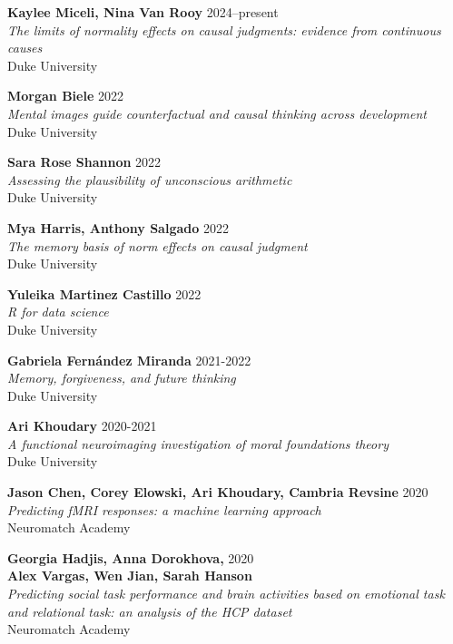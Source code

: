 \textbf{Kaylee Miceli, Nina Van Rooy} \hfill 2024--present \\
\emph{The limits of normality effects on causal judgments: evidence from continuous causes} \\
Duke University

\textbf{Morgan Biele} \hfill 2022 \\
\emph{Mental images guide counterfactual and causal thinking across development} \\
Duke University

\textbf{Sara Rose Shannon} \hfill 2022 \\
\emph{Assessing the plausibility of unconscious arithmetic} \\
Duke University

\textbf{Mya Harris, Anthony Salgado} \hfill 2022 \\
\emph{The memory basis of norm effects on causal judgment} \\
Duke University

\textbf{Yuleika Martinez Castillo} \hfill 2022 \\
\emph{R for data science} \\
Duke University

\textbf{Gabriela Fern\'{a}ndez Miranda} \hfill 2021-2022 \\
\emph{Memory, forgiveness, and future thinking} \\
Duke University

\textbf{Ari Khoudary} \hfill 2020-2021 \\
\emph{A functional neuroimaging investigation of moral foundations theory} \\
Duke University

\textbf{Jason Chen, Corey Elowski, Ari Khoudary, Cambria Revsine} \hfill 2020 \\
\emph{Predicting fMRI responses: a machine learning approach} \\
Neuromatch Academy

\textbf{Georgia Hadjis, Anna Dorokhova,} \hfill 2020 \\
\textbf{Alex Vargas, Wen Jian, Sarah Hanson} \\
\emph{Predicting social task performance and brain activities
based on emotional task and relational task: an analysis of the HCP dataset} \\
Neuromatch Academy
